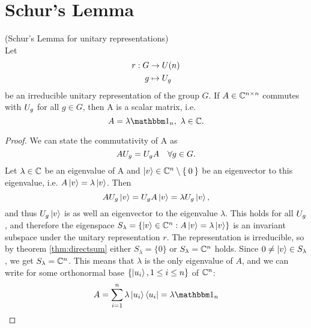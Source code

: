 \documentclass[a4paper,11pt, BCOR=4mm, DIV=12, pagesize]{scrartcl}
\begin{document}
\section{Schur's Lemma}

\begin{thm}(Schur's Lemma for unitary representations)\\
 Let
 \begin{align*}
  r: G&\to U(n)\\
  g&\mapsto U_{g}
 \end{align*}
 be an irreducible unitary 
 representation of the group $G$. If $A\in\cmat{n}$ commutes with  $U_{g}$ 
 for all $g\in G$, then A is a scalar matrix, i.e. 
 \begin{equation*}
  A = \lambda \ind_n,\ \lambda\in\C.
 \end{equation*}
\end{thm}
\begin{proof}
 We can state the commutativity of A as 
 \begin{equation*}
  AU_{g} = U_{g}A\quad \forall g\in G.
 \end{equation*}
 Let $\lambda\in\mathbb{C}$ be an eigenvalue of A and $\ket{v}\in\mathbb{C}^n\setminus\Set{ 0 
}$ be  an eigenvector to this  eigenvalue, i.e. $A\ket{v} = \lambda\ket{v}$. 
Then 
 \begin{equation*}
  AU_{g}\ket{v} = U_{g}A\ket{v} = \lambda U_{g}\ket{v},
 \end{equation*}
 and thus $U_{g}\ket{v}$ is as well an eigenvector to the eigenvalue 
 $\lambda$. This holds for all $U_{g}$, and therefore the eigenspace 
 $S_\lambda = \left\{\ket{v}\in\mathbb{C}^n: A\ket{v} = \lambda\ket{v} \right\}$ is 
 an invariant subspace under the unitary representation $r$. The representation 
 is irreducible, so by theorem \ref{thm:directsum} either $S_\lambda = \{0\}$ 
 or $S_\lambda = \mathbb{C}^n$ holds. Since $0\neq\ket{v}\in S_\lambda$, we get 
$S_\lambda  = \mathbb{C}^n$. This means that $\lambda$ is the only eigenvalue of $A$, 
and we can  write for some orthonormal base $\left\{\ket{u_i}, 1\leq i\leq 
n\right\}$ of $\mathbb{C}^n$:
 \begin{equation*}
  A = \sum\limits_{i=1}^n \lambda \ket{u_i} \bra{u_i} = \lambda\ind_n
 \end{equation*}






\end{proof}
\end{document}
